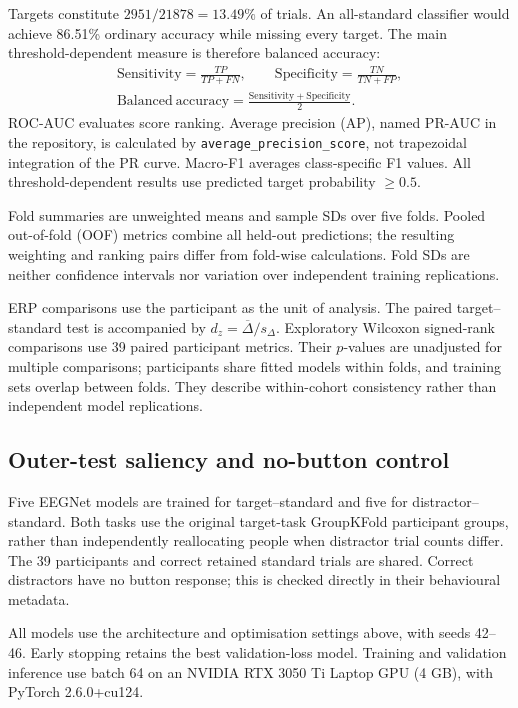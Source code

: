 \documentclass[11pt,a4paper]{article}
\newcommand{\code}[1]{\nolinkurl{#1}}
\begin{document}
Targets constitute $2951/21878=13.49\%$ of trials. An all-standard classifier would achieve 86.51\% ordinary accuracy while missing every target. The main threshold-dependent measure is therefore balanced accuracy:
\begin{equation}
\begin{gathered}
\mathrm{Sensitivity}=\frac{TP}{TP+FN},\qquad
\mathrm{Specificity}=\frac{TN}{TN+FP},\\[3pt]
\mathrm{Balanced\ accuracy}=\frac{\mathrm{Sensitivity}+\mathrm{Specificity}}{2}.
\end{gathered}
\end{equation}
ROC-AUC evaluates score ranking. Average precision (AP), named PR-AUC in the repository, is calculated by \code{average_precision_score}, not trapezoidal integration of the PR curve. Macro-F1 averages class-specific F1 values. All threshold-dependent results use predicted target probability $\geq0.5$.

Fold summaries are unweighted means and sample SDs over five folds. Pooled out-of-fold (OOF) metrics combine all held-out predictions; the resulting weighting and ranking pairs differ from fold-wise calculations. Fold SDs are neither confidence intervals nor variation over independent training replications.

ERP comparisons use the participant as the unit of analysis. The paired target--standard test is accompanied by $d_z=\overline{\Delta}/s_{\Delta}$. Exploratory Wilcoxon signed-rank comparisons use 39 paired participant metrics. Their $p$-values are unadjusted for multiple comparisons; participants share fitted models within folds, and training sets overlap between folds. They describe within-cohort consistency rather than independent model replications.

\subsection{Outer-test saliency and no-button control}
Five EEGNet models are trained for target--standard and five for distractor--standard. Both tasks use the original target-task GroupKFold participant groups, rather than independently reallocating people when distractor trial counts differ. The 39 participants and correct retained standard trials are shared. Correct distractors have no button response; this is checked directly in their behavioural metadata.

All models use the architecture and optimisation settings above, with seeds 42--46. Early stopping retains the best validation-loss model. Training and validation inference use batch 64 on an NVIDIA RTX 3050 Ti Laptop GPU (4 GB), with PyTorch 2.6.0+cu124.
\end{document}
